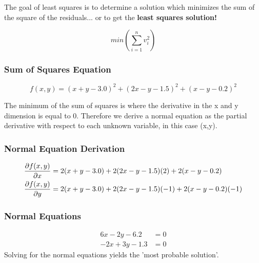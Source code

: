 The goal of least squares is to determine a solution which minimizes the sum of the square of the residuals... or to get the \textbf{least squares solution!}

\[
min(\sum\limits_{i=1}^n v_i^2)
\]

\subsubsection*{Sum of Squares Equation}
\[
f(x,y) = (x+y-3.0)^2 + (2x-y-1.5)^2 + (x-y-0.2)^2
\]

The minimum of the sum of squares is where the derivative in the x and y dimension is equal to 0.  Therefore we derive a normal equation as the partial derivative with respect to each unknown variable, in this case (x,y).

\subsubsection*{Normal Equation Derivation}
\begin{align*}
\frac{\partial f(x,y)}{\partial x} &= 2(x+y-3.0) + 2(2x-y-1.5)(2) + 2(x-y-0.2) \\
\frac{\partial f(x,y)}{\partial y} &= 2(x+y-3.0) + 2(2x-y-1.5)(-1) + 2(x-y-0.2)(-1)
\end{align*}

\subsubsection*{Normal Equations}
\begin{align*}
6x-2y -6.2 &= 0 \\
-2x +3y -1.3 &= 0
\end{align*}
Solving for the normal equations yields the 'most probable solution'.
